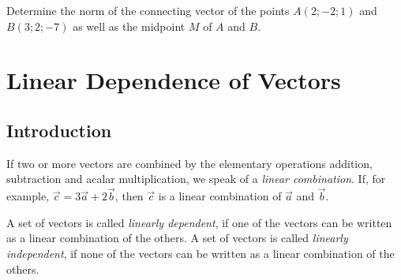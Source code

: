 \documentclass[12pt,eng]{skript_ogg}
\begin{document}
\begin{uebung}
Determine the norm of the connecting vector of the points $A(2;-2;1)$ and $B(3;2;-7)$ as well as the midpoint $M$ of $A$ and $B$.

\vspace{3.3cm}

\end{uebung}

\section{Linear Dependence of Vectors}
\subsection{Introduction}
If two or more vectors are combined by the elementary operations addition, subtraction and acalar multiplication, we speak of a \emph{linear combination}. If, for example,  $\vec{c}=3\vec{a}+2\vec{b}$, then $\vec{c}$ is a linear combination of $\vec{a}$ and $\vec{b}$.
\begin{center}
\end{center}

\begin{defn}
A set of vectors is called \emph{linearly dependent}, if one of the vectors can be written as a linear combination of the others. A set of vectors is called \emph{linearly independent}, if none of the vectors can be written as a linear combination of the others.
\end{defn}
\end{document}
